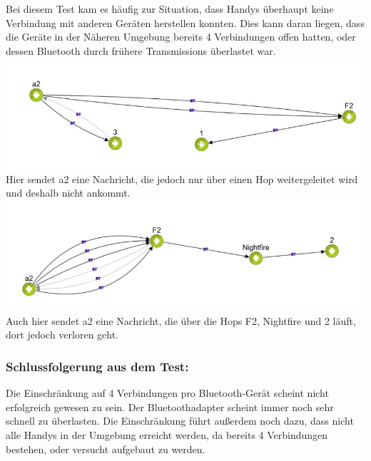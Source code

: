 Bei diesem Test kam es häufig zur Situation, dass Handys überhaupt keine
Verbindung mit anderen Geräten herstellen konnten. Dies kann daran
liegen, dass die Geräte in der Näheren Umgebung bereits 4 Verbindungen
offen hatten, oder dessen Bluetooth durch frühere Transmissions
überlastet war.\\

\includegraphics[width=1.0\textwidth]{belege/grosstests/Bilder/Grosstest2/Test1Misserfolg1.jpg}\\
Hier sendet a2 eine Nachricht, die jedoch nur über einen Hop
weitergeleitet wird und deshalb nicht ankommt.\\
\includegraphics[width=1.0\textwidth]{belege/grosstests/Bilder/Grosstest2/Test1Misserfolg3.jpg}\\
Auch hier sendet a2 eine Nachricht, die über die Hops F2, Nightfire und
2 läuft, dort jedoch verloren geht.\\

\subsubsection{Schlussfolgerung aus dem
Test:}\label{schlussfolgerung-aus-dem-test-2}

Die Einschränkung auf 4 Verbindungen pro Bluetooth-Gerät scheint nicht
erfolgreich gewesen zu sein. Der Bluetoothadapter scheint immer noch
sehr schnell zu überlasten. Die Einschränkung führt außerdem noch dazu,
dass nicht alle Handys in der Umgebung erreicht werden, da bereits 4
Verbindungen bestehen, oder versucht aufgebaut zu werden.\\\\


